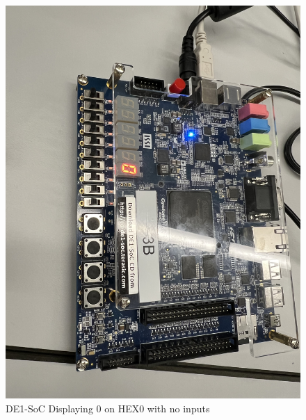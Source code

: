 \documentclass[
	letterpaper, %
	10pt, %
]{CSUniSchoolLabReport}
\begin{document}
\begin{figure}[H]
  \centering
  \includegraphics[width=.9\textwidth]{Figures/Disp_0.jpg}
  \caption{DE1-SoC Displaying 0 on HEX0 with no inputs}
  \label{fig:3}
\end{figure}
\end{document}
